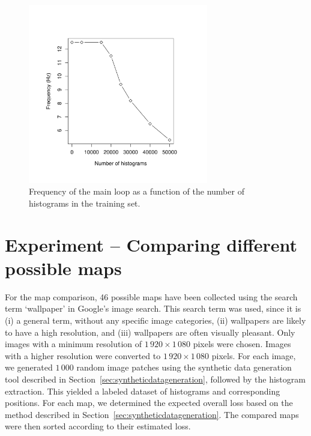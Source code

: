 \documentclass[11pt]{report}
\begin{document}
\begin{figure}[h]
  \centering
\includegraphics[width=0.7\textwidth]{histograms_vs_freq}
  \caption{Frequency of the main loop as a function of the number of
    histograms in the training set.}
  \label{fig:freqpart}
\end{figure}


\section{Experiment -- Comparing different possible maps}

For the map comparison, 46 possible maps have been collected using the
search term `wallpaper' in Google's image search. This search term was
used, since it is (i) a general term, without any specific image
categories, (ii) wallpapers are likely to have a high resolution, and
(iii) wallpapers are often visually pleasant. Only images with a
minimum resolution of $1\,920 \times 1\,080$ pixels were
chosen. Images with a higher resolution were converted to
$1\,920 \times 1\,080$ pixels. For each image, we generated $1\,000$
random image patches using the synthetic data generation tool
described in Section~\ref{sec:syntheticdatageneration}, followed by
the histogram extraction. This yielded a labeled dataset of histograms
and corresponding positions. For each map, we determined the expected
overall loss based on the method described in
Section~\ref{sec:syntheticdatageneration}. The compared maps were then
sorted according to their estimated loss.

\end{document}

